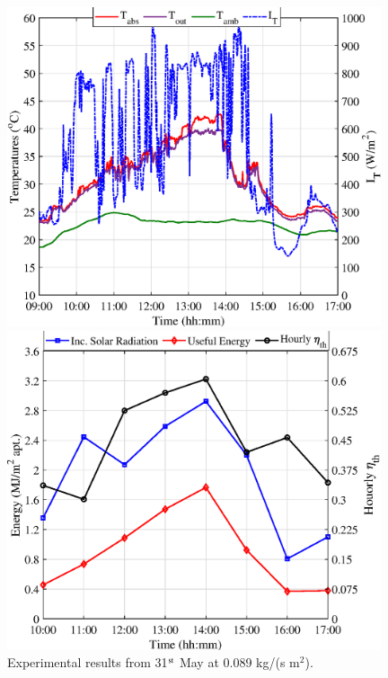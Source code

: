 \begin{figure}[!ht]
	\centering
	\begin{minipage}{0.49\textwidth}
		\centering
		\includegraphics[width=0.98\textwidth]{figs/009-1.eps} %
	\end{minipage}\hfill
	\begin{minipage}{0.49\textwidth}
		\centering
		\includegraphics[width=0.98\textwidth]{figs/009-2.eps} %
	\end{minipage}
	
	\caption{Experimental results from 31$^{\rm{st}}$ May at 0.089 kg/(s m$^2$).}
	\label{009}
\end{figure}

